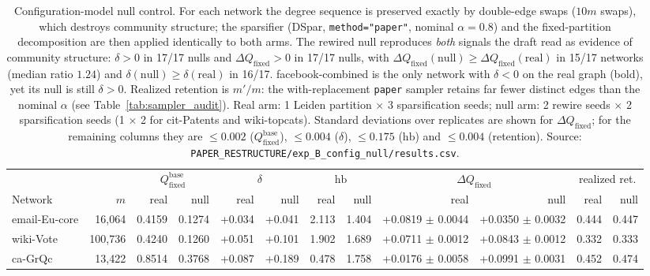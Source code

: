 \begin{table}[t]
\centering
\setlength{\tabcolsep}{4pt}
\caption{Configuration-model null control. For each network the degree sequence is preserved
exactly by double-edge swaps ($10m$ swaps), which destroys community structure; the sparsifier
(DSpar, \texttt{method="paper"}, nominal $\alpha=0.8$) and the fixed-partition decomposition are
then applied identically to both arms. The rewired null reproduces \emph{both} signals the draft
read as evidence of community structure: $\delta>0$ in 17/17 nulls and $\Delta Q_{\mathrm{fixed}}>0$
in 17/17 nulls, with $\Delta Q_{\mathrm{fixed}}(\mathrm{null})\ge\Delta Q_{\mathrm{fixed}}(\mathrm{real})$
in 15/17 networks (median ratio $1.24$) and $\delta(\mathrm{null})\ge\delta(\mathrm{real})$ in 16/17.
facebook-combined is the only network with $\delta<0$ on the real graph (bold), yet its null is still
$\delta>0$. Realized retention is $m'/m$: the with-replacement \texttt{paper} sampler retains far
fewer distinct edges than the nominal $\alpha$ (see Table~\ref{tab:sampler_audit}).
Real arm: 1 Leiden partition $\times$ 3 sparsification seeds; null arm: 2 rewire seeds $\times$
2 sparsification seeds (1 $\times$ 2 for cit-Patents and wiki-topcats). Standard deviations over
replicates are shown for $\Delta Q_{\mathrm{fixed}}$; for the remaining columns they are
$\le 0.002$ ($Q_{\mathrm{fixed}}^{\mathrm{base}}$), $\le 0.004$ ($\delta$), $\le 0.175$ ($\mathrm{hb}$) and
$\le 0.004$ (retention).
Source: \texttt{PAPER\_RESTRUCTURE/exp\_B\_config\_null/results.csv}.}
\label{tab:null_control}
\footnotesize
\begin{tabular}{lrrrrrrrrrrr}
\toprule
 & & \multicolumn{2}{c}{$Q_{\mathrm{fixed}}^{\mathrm{base}}$} & \multicolumn{2}{c}{$\delta$}
 & \multicolumn{2}{c}{$\mathrm{hb}$} & \multicolumn{2}{c}{$\Delta Q_{\mathrm{fixed}}$}
 & \multicolumn{2}{c}{realized ret.} \\
\cmidrule(lr){3-4}\cmidrule(lr){5-6}\cmidrule(lr){7-8}\cmidrule(lr){9-10}\cmidrule(lr){11-12}
Network & $m$ & real & null & real & null & real & null & real & null & real & null \\
\midrule
email-Eu-core & 16,064 & 0.4159 & 0.1274 & +0.034 & +0.041 & 2.113 & 1.404 & +0.0819 $\pm$ 0.0044 & +0.0350 $\pm$ 0.0032 & 0.444 & 0.447 \\
wiki-Vote & 100,736 & 0.4240 & 0.1260 & +0.051 & +0.101 & 1.902 & 1.689 & +0.0711 $\pm$ 0.0012 & +0.0843 $\pm$ 0.0012 & 0.332 & 0.333 \\
ca-GrQc & 13,422 & 0.8514 & 0.3768 & +0.087 & +0.189 & 0.478 & 1.758 & +0.0176 $\pm$ 0.0058 & +0.0991 $\pm$ 0.0031 & 0.452 & 0.474 \\

\end{tabular}
\end{table}
